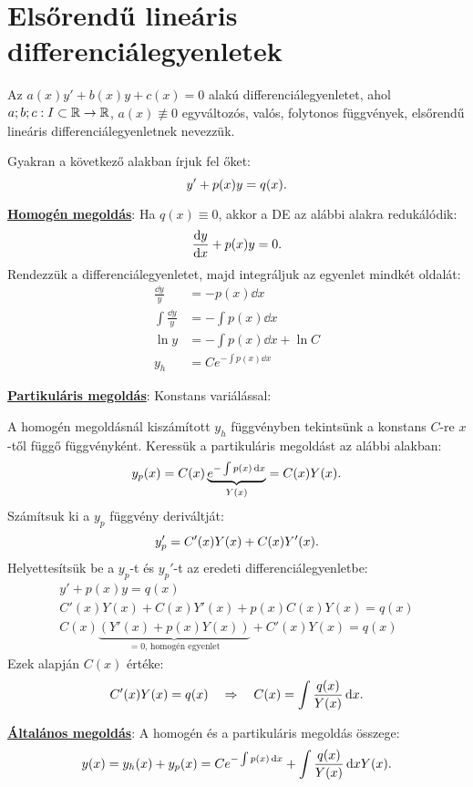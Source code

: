 \clearpage
\section{Elsőrendű lineáris differenciálegyenletek}

\begin{definition}
  Az $a(x) y' + b(x) y + c(x) = 0$ alakú differenciálegyenletet, ahol
  $a;b;c : I \subset \mathbb{R} \rightarrow \mathbb{R}$, $a(x) \not \equiv 0$
  egyváltozós, valós, folytonos függvények, elsőrendű lineáris
  differenciálegyenletnek nevezzük.\

  Gyakran a következő alakban írjuk fel őket:
  $$
    y' + p(x) y = q(x)
    \text.
  $$
\end{definition}

\begin{blueBox}
  \underline{\textbf{Homogén megoldás}}: Ha $q(x) \equiv 0$, akkor a DE az
  alábbi alakra redukálódik:
  $$
    \odv{y}{x} + p(x) y = 0
    \text.
  $$
  Rendezzük a differenciálegyenletet, majd integráljuk az egyenlet mindkét
  oldalát:
  \begin{align*}
    \frac{\dd y}{y}      & = -p(x) \dd x
    \\
    \int \frac{\dd y}{y} & = -\int p(x) \dd x
    \\
    \ln y                & = -\int p(x) \dd x + \ln C
    \\
    y_h                  & = C e^{-\int p(x) \dd x}
  \end{align*}

  \underline{\textbf{Partikuláris megoldás}}: Konstans variálással:

  A homogén megoldásnál kiszámított $y_h$ függvényben tekintsünk a konstans
  $C$-re $x$-től függő függvényként. Keressük a partikuláris megoldást az
  alábbi alakban:
  $$
    y_p(x) = C(x) \underbrace{e^{-\int p(x) \mathop{}\!\mathrm{d} x}}_{Y(x)} = C(x) Y(x)
    \text.
  $$
  Számítsuk ki a $y_p$ függvény deriváltját:
  $$
    y_p' = C'(x) Y(x) + C(x) Y'(x)
    \text.
  $$
  Helyettesítsük be a $y_p$-t és $y_p'$-t az eredeti differenciálegyenletbe:
  \begin{gather*}
    y' + p(x) y = q(x)
    \\
    C'(x) Y(x) + C(x) Y'(x) + p(x) C(x) Y(x) = q(x)
    \\
    C(x) \underbrace{
      \left( Y'(x) + p(x) Y(x) \right)
    }_{= 0\text{, homogén egyenlet}} + C'(x) Y(x) = q(x)
  \end{gather*}
  Ezek alapján $C(x)$ értéke:
  $$
    C'(x) Y(x) = q(x)
    \quad \Rightarrow \quad
    C(x) = \int \frac{q(x)}{Y(x)} \mathop{}\!\mathrm{d} x
    \text.
  $$

  \underline{\textbf{Általános megoldás}}: A homogén és a partikuláris megoldás
  összege:
  $$
    y(x)
    = y_h(x) + y_p(x)
    = C e^{-\int p(x) \mathop{}\!\mathrm{d} x} + \int \frac{q(x)}{Y(x)} \mathop{}\!\mathrm{d} x Y(x)
    \text.
  $$
\end{blueBox}

